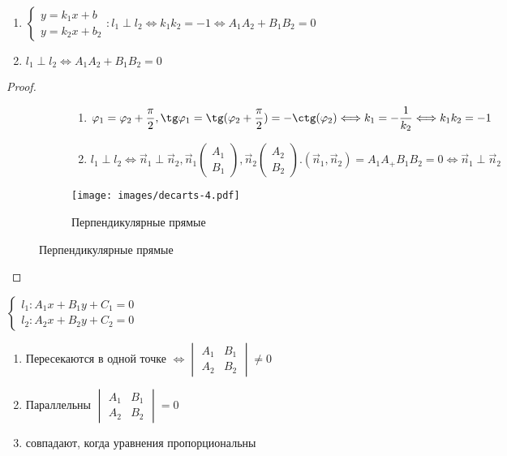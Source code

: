 \begin{proposition}
	\begin{enumerate}
		\item \(\left\{
		\begin{gathered}
			y = k_1x+b \\
			y = k_2x+b_2
		\end{gathered}
		\right.: l_1 \perp l_2 \Longleftrightarrow k_1k_2 = -1 \Longleftrightarrow A_1A_2 + B_1B_2 = 0\)
		\item \(l_1 \perp l_2 \Longleftrightarrow A_1A_2 + B_1B_2 = 0\)
	\end{enumerate}
\end{proposition}
\begin{proof}
	\begin{figure}[h]
		\begin{subfigure}[t!]{0.6\linewidth}
			\begin{enumerate}
				\item \(\phi_1 = \phi_2 + \dfrac{\pi}{2}, \tg\phi_1 = \tg(\phi_2 + \dfrac{\pi}{2}) = -\ctg(\phi_2)\Longleftrightarrow k_1 = -\dfrac{1}{k_2}\Longleftrightarrow k_1k_2 = -1\)
				\item \(l_1 \perp l_2 \Longleftrightarrow \vec n_1 \perp \vec n_2, \vec n_1\begin{pmatrix}
					A_1 \\ B_1
				\end{pmatrix}, \vec n_2 \begin{pmatrix}
					A_2 \\ B_2
				\end{pmatrix}. (\vec n_1, \vec n_2) = A_1A_+B_1B_2 = 0 \Longleftrightarrow \vec n_1 \perp \vec n_2\)
			\end{enumerate}
		\end{subfigure}
		\begin{subfigure}[b!]{0.4\linewidth}
			\centering
			\texttt{[image: images/decarts-4.pdf]}
			\caption*{Перпендикулярные прямые}
			\label{Decart4}
		\end{subfigure}
	\end{figure}
\end{proof}
\begin{proposition}
	\(\left\{
	\begin{gathered}
		l_1: A_1x+B_1y+C_1 = 0 \\
		l_2: A_2x + B_2y + C_2 = 0
	\end{gathered}
	\right.\)
	\newline
	\begin{enumerate}
		\item Пересекаются в одной точке $\Longleftrightarrow \begin{vmatrix}
			A_1 & B_1 \\ A_2 & B_2
		\end{vmatrix} \ne 0$
		\item Параллельны $\begin{vmatrix}
			A_1 & B_1 \\ A_2 & B_2
		\end{vmatrix} = 0$
		\item совпадают, когда уравнения пропорциональны
	\end{enumerate}
\end{proposition}
